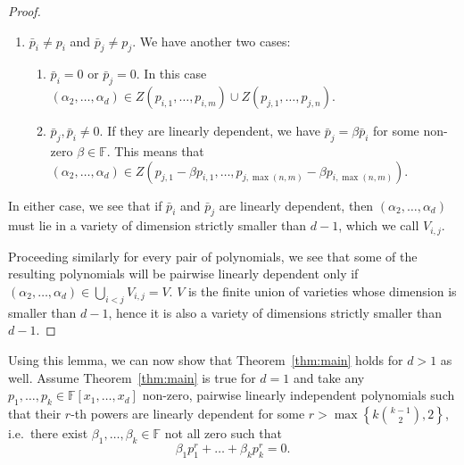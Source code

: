 \documentclass{amsart}
\theoremstyle{definition}
\theoremstyle{remark}
\numberwithin{equation}{section}
\newcommand{\F}{\mathbb{F}}
\begin{document}
\begin{proof}
\begin{enumerate}
		\item
			$ \bar{p}_i \neq p_i $ and $ \bar{p}_j \neq p_j	$. We have another
			two cases:
			\begin{enumerate}
				\item
					$ \bar{p}_i = 0 $ or $ \bar{p}_j = 0 $. In this case $
					(\alpha_2, \ldots, \alpha_d) \in Z(p_{i,1}, \ldots, p_{i,
					m}) \cup Z(p_{j,1}, \ldots, p_{j, n})$.
				\item 
					$ \bar{p}_j, \bar{p}_i \neq 0$. If they are linearly
					dependent, we have $ \bar{p}_j = \beta \bar{p}_i $ for some
					non-zero $ \beta \in \F $. This means that $ (\alpha_2,
					\ldots, \alpha_d) \in Z(p_{j,1} -\beta p_{i,1}, \ldots,
					p_{j,\max(n,m)} -\beta p_{i,\max(n,m)}) $.
			\end{enumerate}
	\end{enumerate}

	In either case, we see that if $ \bar{p}_i $ and $ \bar{p}_j $ are linearly
	dependent, then $ (\alpha_2, \ldots, \alpha_d) $ must lie in a variety of
	dimension strictly smaller than $ d-1 $, which we call $ V_{i,j} $. 

	Proceeding similarly for every pair of polynomials, we see that some of the
	resulting polynomials will be pairwise linearly dependent only if $
	(\alpha_2, \ldots, \alpha_d) \in \bigcup_{i < j} V_{i,j}  = V$. $ V $ is the
	finite union of varieties whose dimension is smaller than $ d-1 $, hence it
	is also a variety of dimensions strictly smaller than $ d-1 $. 
\end{proof}

Using this lemma, we can now show that Theorem~\ref{thm:main} holds for $ d>1
$ as well. Assume Theorem~\ref{thm:main} is true for $ d=1 $ and take any $ p_1, \ldots, p_k \in
\F[x_1, \ldots, x_d] $ non-zero, pairwise linearly independent polynomials such
that their $ r $-th powers are linearly dependent for some $ r > \max\left\{k
\binom{k-1}{2},2 \right\} $, i.e.\ there exist $ \beta_1, \ldots,
\beta_k \in \F $ not all zero such that 
%
\begin{equation}
	\label{eq:lin_dep_power}
	\beta_1p_1^r + \ldots + \beta_kp_k^r = 0.
\end{equation}
\end{document}
